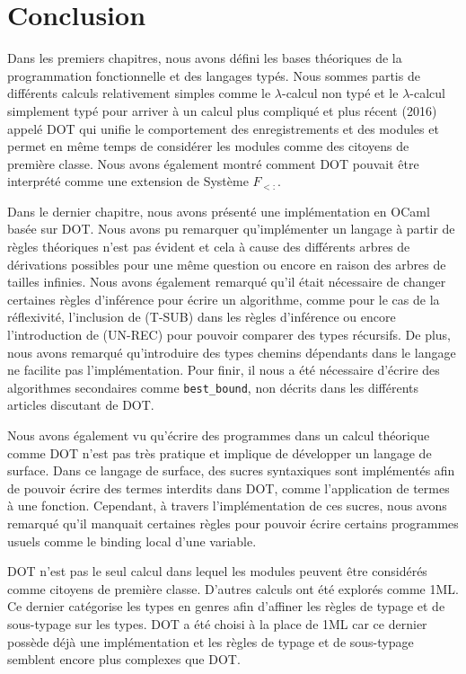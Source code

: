 \chapter*{Conclusion}

Dans les premiers chapitres, nous avons défini les bases théoriques de la
programmation fonctionnelle et des langages typés. Nous sommes partis de
différents calculs relativement simples comme le $\lambda$-calcul non typé et le
$\lambda$-calcul simplement typé pour arriver à un calcul plus compliqué et plus
récent (2016) appelé DOT qui unifie
le comportement des enregistrements et des modules et permet en même temps
de considérer les modules comme des citoyens de première classe. Nous
avons également montré comment DOT pouvait être interprété comme une extension
de Système $F_{<:}$.

Dans le dernier chapitre, nous avons présenté une implémentation en OCaml basée
sur DOT. Nous avons pu remarquer qu'implémenter un langage à partir de règles
théoriques n'est pas évident et cela à cause des différents arbres de
dérivations possibles pour une même question ou encore en raison des arbres de
tailles infinies.
Nous avons également remarqué qu'il était nécessaire de changer certaines règles
d'inférence pour écrire un algorithme, comme pour le cas de la réflexivité,
l'inclusion de (T-SUB) dans les règles d'inférence ou encore l'introduction de
(UN-REC) pour pouvoir comparer des types récursifs.
De plus, nous avons remarqué qu'introduire des types chemins dépendants dans le
langage ne facilite pas l'implémentation. Pour finir, il nous a été nécessaire
d'écrire des algorithmes secondaires comme \verb|best_bound|, non décrits dans
les différents articles discutant de DOT.

Nous avons également vu qu'écrire des programmes dans un calcul théorique comme
DOT n'est pas très pratique et implique de développer un langage de surface.
Dans ce langage de surface, des sucres syntaxiques sont implémentés afin de
pouvoir écrire des termes interdits dans DOT, comme l'application de termes à
une fonction. Cependant, à travers l'implémentation de ces sucres, nous avons
remarqué qu'il manquait certaines règles pour pouvoir écrire certains programmes
usuels comme le binding local d'une variable.

DOT n'est pas le seul calcul dans lequel les modules peuvent être considérés
comme citoyens de première classe. D'autres calculs ont été explorés comme
1ML\cite{1ml-paper}. Ce dernier catégorise les types en
genres\cite{tapl-higher-order-systems} afin d'affiner les règles de typage et
de sous-typage sur les types. DOT a été choisi à la place de 1ML car ce dernier possède
déjà une implémentation et les règles de typage et de sous-typage semblent
encore plus complexes que DOT.


